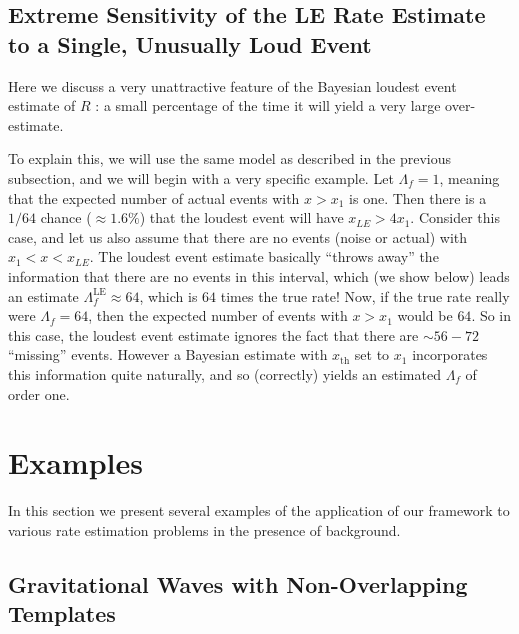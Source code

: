 \documentclass[aps,prd,reprint,nofootinbib]{revtex4-1}
\begin{document}
\subsection{Extreme Sensitivity of the LE Rate Estimate to a Single, Unusually Loud Event}
Here we discuss a very unattractive feature of the Bayesian loudest
event estimate of $R$ \citep{Biswas2009}: a small percentage of the
time it will yield a very large over-estimate.

To explain this, we will use the same model as described in the
previous subsection, and we will begin with a very specific example.
Let $\Lambda_f = 1$, meaning that the expected number of actual events
with $x > x_1$ is one.  Then there is a $1/64$ chance ($\approx
1.6\%$) that the loudest event will have $x_{LE} > 4 x_1$.  Consider
this case, and let us also assume that there are no events (noise or
actual) with $x_1 < x < x_{LE}$.  The loudest event estimate basically
``throws away'' the information that there are no events in this
interval, which (we show below) leads an estimate
$\Lambda_f^\mathrm{LE} \approx 64$, which is $64$ times the true rate!
Now, if the true rate really were $\Lambda_f = 64$, then the expected
number of events with $x > x_1$ would be $64$.  So in this case, the
loudest event estimate ignores the fact that there are $\sim 56 -72$
``missing'' events.  However a Bayesian estimate with $x_\mathrm{th}$
set to $x_1$ incorporates this information quite naturally, and so
(correctly) yields an estimated $\Lambda_f$ of order one.

\section{Examples}
\label{sec:GW-example}

In this section we present several examples of the application of our
framework to various rate estimation problems in the presence of
background.

\subsection{Gravitational Waves with Non-Overlapping Templates}
\label{sec:analytic-GW-example}
\end{document}
